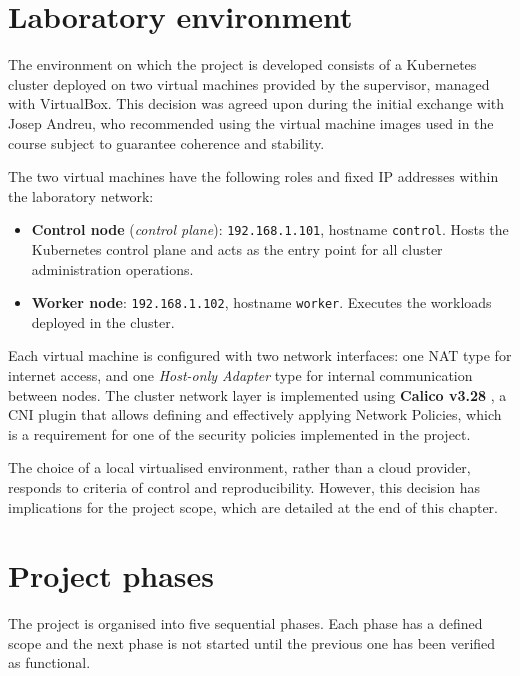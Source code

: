 \section{Laboratory environment}

The environment on which the project is developed consists of a Kubernetes cluster deployed on two virtual machines provided by the supervisor, managed with VirtualBox. This decision was agreed upon during the initial exchange with Josep Andreu, who recommended using the virtual machine images used in the course subject to guarantee coherence and stability.

The two virtual machines have the following roles and fixed IP addresses within the laboratory network:

\begin{itemize}
    \item \textbf{Control node} (\textit{control plane}): \texttt{192.168.1.101}, hostname \texttt{control}. Hosts the Kubernetes control plane and acts as the entry point for all cluster administration operations.
    \item \textbf{Worker node}: \texttt{192.168.1.102}, hostname \texttt{worker}. Executes the workloads deployed in the cluster.
\end{itemize}

Each virtual machine is configured with two network interfaces: one NAT type for internet access, and one \textit{Host-only Adapter} type for internal communication between nodes. The cluster network layer is implemented using \textbf{Calico v3.28} \cite{calico_docs}, a CNI plugin that allows defining and effectively applying Network Policies, which is a requirement for one of the security policies implemented in the project.

The choice of a local virtualised environment, rather than a cloud provider, responds to criteria of control and reproducibility. However, this decision has implications for the project scope, which are detailed at the end of this chapter.

\section{Project phases}

The project is organised into five sequential phases. Each phase has a defined scope and the next phase is not started until the previous one has been verified as functional.


